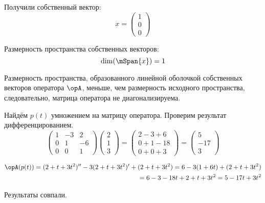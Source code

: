 Получили собственный вектор:
\[x = \begin{pmatrix} 1\\0\\0  \end{pmatrix}\]

Размерность пространства собственных векторов:
\[\dim(\mSpan\{x\}) = 1\]

Размерность пространства, образованного линейной оболочкой
собственных векторов оператора \(\opA\), меньше, чем
размерность исходного пространства, следовательно,
матрица оператора не диагонализируема.

Найдём \(p(t)\) умножением на матрицу оператора.
Проверим результат дифференцированием.
\[
  \begin{pmatrix}
    1 & -3 & 2\\
    0 & 1 & -6\\
    0 & 0 & 1
  \end{pmatrix}
  \begin{pmatrix} 2\\ 1\\ 3 \end{pmatrix}
  =
  \begin{pmatrix}
      2 - 3 + 6 \\
      0 + 1 - 18 \\
      0 + 0 + 3
  \end{pmatrix}
  =
  \begin{pmatrix} 5 \\ -17 \\ 3 \end{pmatrix}
\]

\[
\begin{split}
  \opA(p(t))
  = (2 + t + 3t^2)^{\prime\prime}
  - 3(2 + t + 3t^2)^\prime
  + (2 + t + 3t^2)
  = 6 - 3(1 + 6t) + (2 + t + 3t^2) \\
  = 6 - 3 - 18t + 2 + t + 3t^2
  = 5 - 17t + 3t^2
\end{split}
\]

Результаты совпали.
